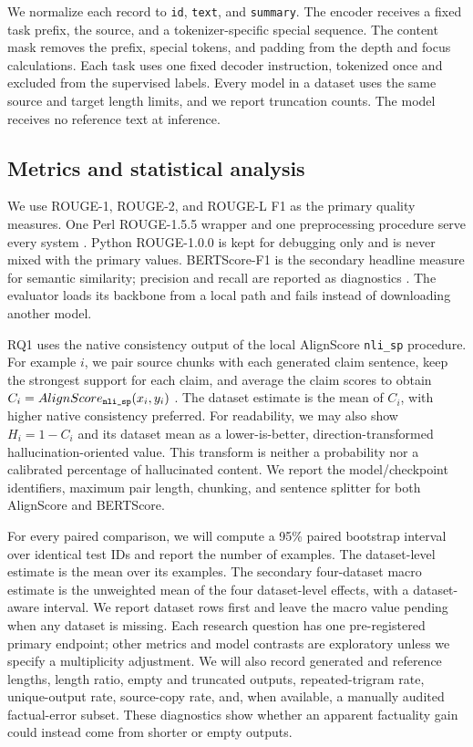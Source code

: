 We normalize each record to \texttt{id}, \texttt{text}, and \texttt{summary}.
The encoder receives a fixed task prefix, the source, and a tokenizer-specific
special sequence.  The content mask removes the prefix, special tokens, and
padding from the depth and focus calculations.  Each task uses one fixed
decoder instruction, tokenized once and excluded from the supervised labels.
Every model in a dataset uses the same source and target length limits, and we
report truncation counts.  The model receives no reference text at inference.

\subsection{Metrics and statistical analysis}
\label{sec:metrics}

We use ROUGE-1, ROUGE-2, and ROUGE-L F1 as the primary quality measures.  One
Perl ROUGE-1.5.5 wrapper and one preprocessing procedure serve every system
\citep{lin2004rouge}.  Python ROUGE-1.0.0 is kept for debugging only and is
never mixed with the primary values.  BERTScore-F1 is the secondary headline
measure for semantic similarity; precision and recall are reported as
diagnostics \citep{zhang2020bertscore}.  The evaluator loads its backbone from
a local path and fails instead of downloading another model.

RQ1 uses the native consistency output of the local AlignScore
\texttt{nli\_sp} procedure.  For example $i$, we pair source chunks with each
generated claim sentence, keep the strongest support for each claim, and
average the claim scores to obtain $C_i=AlignScore_{\texttt{nli\_sp}}(x_i,y_i)$
\citep{zha-etal-2023-alignscore}.  The dataset estimate is the mean of $C_i$,
with higher native consistency preferred.  For readability, we may also show
$H_i=1-C_i$ and its dataset mean as a lower-is-better, direction-transformed
hallucination-oriented value.  This transform is neither a probability nor a
calibrated percentage of hallucinated content.  We report the model/checkpoint
identifiers, maximum pair length, chunking, and sentence splitter for both
AlignScore and BERTScore.

For every paired comparison, we will compute a 95\% paired bootstrap interval
over identical test IDs and report the number of examples.  The dataset-level
estimate is the mean over its examples.  The secondary four-dataset macro
estimate is the unweighted mean of the four dataset-level effects, with a
dataset-aware interval.  We report dataset rows first and leave the macro value
pending when any dataset is missing.  Each research question has one
pre-registered primary endpoint; other metrics and model contrasts are
exploratory unless we specify a multiplicity adjustment.  We will also record
generated and reference lengths, length ratio, empty and truncated outputs,
repeated-trigram rate, unique-output rate, source-copy rate, and, when
available, a manually audited factual-error subset.  These diagnostics show
whether an apparent factuality gain could instead come from shorter or empty
outputs.

